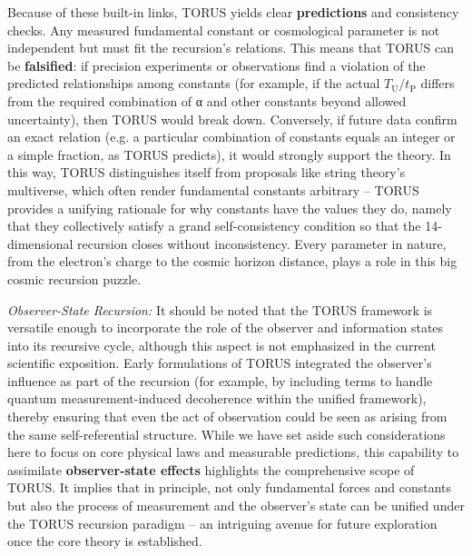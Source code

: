\documentclass[]{article}
\newcommand{\subscript}[1]{\ensuremath{_{\mathrm{#1}}}}
\begin{document}
Because of these built-in links, TORUS yields clear \textbf{predictions}
and consistency checks. Any measured fundamental constant or
cosmological parameter is not independent but must fit the recursion's
relations. This means that TORUS can be \textbf{falsified}: if precision
experiments or observations find a violation of the predicted
relationships among constants (for example, if the actual
$T\subscript{U} /
t\subscript{P}$ differs
from the required combination of α and other constants beyond allowed
uncertainty), then TORUS would break down. Conversely, if future data
confirm an exact relation (e.g. a particular combination of constants
equals an integer or a simple fraction, as TORUS predicts), it would
strongly support the theory. In this way, TORUS distinguishes itself
from proposals like string theory's multiverse, which often render
fundamental constants arbitrary -- TORUS provides a unifying rationale
for why constants have the values they do, namely that they collectively
satisfy a grand self-consistency condition so that the 14-dimensional
recursion closes without inconsistency. Every parameter in nature, from
the electron's charge to the cosmic horizon distance, plays a role in
this big cosmic recursion puzzle.

\emph{Observer-State Recursion:} It should be noted that the TORUS
framework is versatile enough to incorporate the role of the observer
and information states into its recursive cycle, although this aspect is
not emphasized in the current scientific exposition. Early formulations
of TORUS integrated the observer's influence as part of the recursion
(for example, by including terms to handle quantum measurement-induced
decoherence within the unified framework), thereby ensuring that even
the act of observation could be seen as arising from the same
self-referential structure. While we have set aside such considerations
here to focus on core physical laws and measurable predictions, this
capability to assimilate \textbf{observer-state effects} highlights the
comprehensive scope of TORUS. It implies that in principle, not only
fundamental forces and constants but also the process of measurement and
the observer's state can be unified under the TORUS recursion paradigm
-- an intriguing avenue for future exploration once the core theory is
established.
\end{document}
